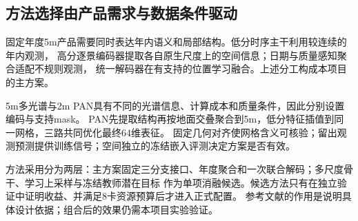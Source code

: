 \documentclass[UTF8,fontset=fandol,zihao=5,a4paper]{ctexart}
\newcommand{\note}[1]{\par\smallskip\noindent\colorbox{pale}{\parbox{0.95\linewidth}{\small #1}}\par\smallskip}
\begin{document}
\subsection{方法选择由产品需求与数据条件驱动}
固定年度5m产品需要同时表达年内语义和局部结构。低分时序主干利用较连续的年内观测，
高分逐景编码器提取各自原生尺度上的空间信息；日期与质量感知聚合适配不规则观测，
统一解码器在有支持的位置学习融合。上述分工构成本项目的主方案。

5m多光谱与2m PAN具有不同的光谱信息、计算成本和质量条件，因此分别设置编码与支持mask。
PAN先提取结构再按地面交叠聚合到5m，低分特征插值到同一网格，三路共同优化最终64维表征。
固定几何对齐使网格含义可核验；留出观测预测提供训练信号；空间独立的冻结嵌入评测决定方案是否有效。

\note{方法采用分为两层：主方案固定三分支接口、年度聚合和一次联合解码；多尺度骨干、学习上采样与冻结教师潜在目标
作为单项消融候选。候选方法只有在独立验证中证明收益、并满足8卡资源预算后才进入正式配置。
参考文献的作用是说明具体设计依据；组合后的效果仍需本项目实验验证。}
\end{document}
